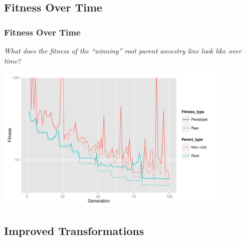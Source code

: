 \documentclass{beamer}
\begin{document}
\subsection[Fitness Graph]{Fitness Over Time}

\begin{frame}
\frametitle{Fitness Over Time}
\emph{What does the fitness of the ``winning'' root parent ancestry line look like over time?}
\begin{center}
\includegraphics[width=0.85\textwidth]{Combined_fitness_over_time}
\end{center}
\end{frame}

\subsection[Improved Transformations]{Improved Transformations}
\end{document}
